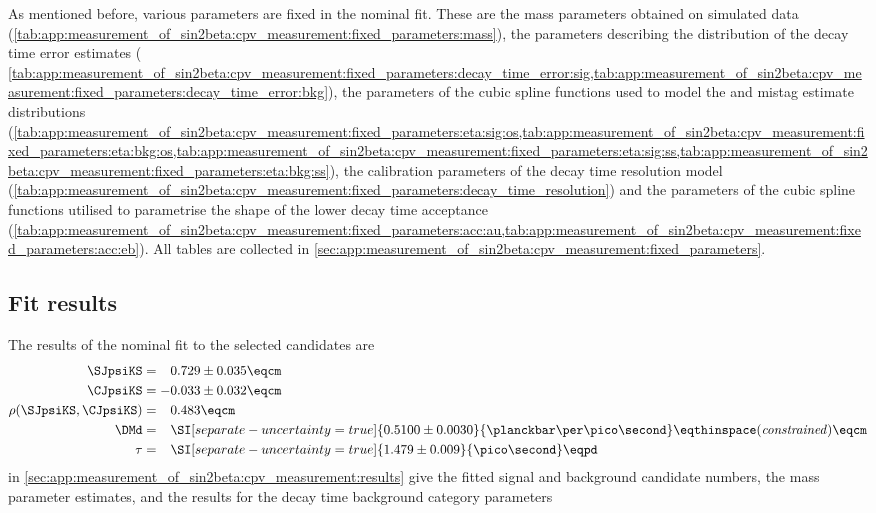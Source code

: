 As mentioned before, various parameters are fixed in the nominal fit. These are
the mass parameters obtained on simulated data
(\cref{tab:app:measurement_of_sin2beta:cpv_measurement:fixed_parameters:mass}), the
parameters describing the distribution of the decay time error estimates (
\cref{tab:app:measurement_of_sin2beta:cpv_measurement:fixed_parameters:decay_time_error:sig,tab:app:measurement_of_sin2beta:cpv_measurement:fixed_parameters:decay_time_error:bkg}), 
the parameters of the cubic spline functions used to model the \OS and
\SSpi mistag estimate distributions (\cref{tab:app:measurement_of_sin2beta:cpv_measurement:fixed_parameters:eta:sig:os,tab:app:measurement_of_sin2beta:cpv_measurement:fixed_parameters:eta:bkg:os,tab:app:measurement_of_sin2beta:cpv_measurement:fixed_parameters:eta:sig:ss,tab:app:measurement_of_sin2beta:cpv_measurement:fixed_parameters:eta:bkg:ss}), 
the calibration parameters of the decay time resolution model (\cref{tab:app:measurement_of_sin2beta:cpv_measurement:fixed_parameters:decay_time_resolution}) 
and the parameters of the cubic spline functions utilised to parametrise
the shape of the lower decay time acceptance (\cref{tab:app:measurement_of_sin2beta:cpv_measurement:fixed_parameters:acc:au,tab:app:measurement_of_sin2beta:cpv_measurement:fixed_parameters:acc:eb}). 
All tables are collected in \cref{sec:app:measurement_of_sin2beta:cpv_measurement:fixed_parameters}.

\subsection{Fit results}
\label{sec:measurement_of_sin2beta:cpv_measurement:results}

The results of the nominal \uEML fit to the selected \BdToJpsiKS candidates are
%
\begin{equation}\label{eq:measurement_of_sin2beta:cpv_measurement:results}
  \begin{split}
    \SJpsiKS                &= \phantom{+}0.729 \pm 0.035 \eqcm \\
    \CJpsiKS                &= -0.033 \pm 0.032 \eqcm \\
    \rho(\SJpsiKS,\CJpsiKS) &= \phantom{+}0.483 \eqcm \\
    \DMd                    &= \phantom{+}\SI[separate-uncertainty=true]{0.5100 \pm 0.0030}{\planckbar\per\pico\second} \eqthinspace (\text{\textit{constrained}})\eqcm \\
    \tau                    &= \phantom{+}\SI[separate-uncertainty=true]{1.479 \pm 0.009}{\pico\second} \eqpd \\
  \end{split}
\end{equation}
%
 in \cref{sec:app:measurement_of_sin2beta:cpv_measurement:results} 
give the fitted signal and background candidate numbers, the mass parameter
estimates, and the results for the decay time background category parameters


